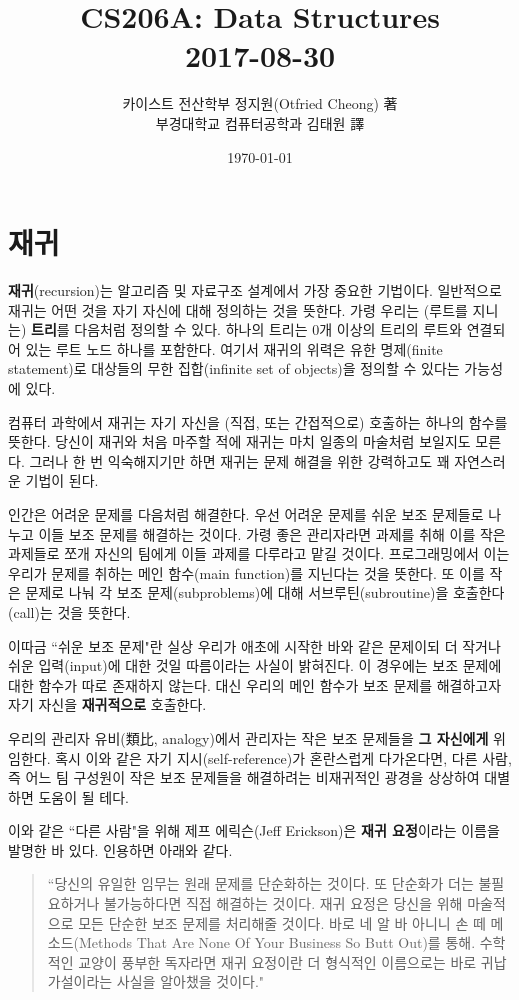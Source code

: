 \documentclass[a4paper]{oblivoir}
\title{CS206A: Data Structures\\2017-08-30}
\author{카이스트 전산학부 정지원(Otfried Cheong) 著\\부경대학교 컴퓨터공학과 김태원 譯}
\date{\today}
\begin{document}
\maketitle

\section*{재귀}
\noindent\textbf{재귀}(recursion)는 알고리즘 및 자료구조 설계에서 가장 중요한 기법이다. 일반적으로 재귀는 어떤 것을 자기 자신에 대해 정의하는 것을 뜻한다. 가령 우리는 (루트를 지니는) \textbf{트리}를 다음처럼 정의할 수 있다. 하나의 트리는 $0$개 이상의 트리의 루트와 연결되어 있는 루트 노드 하나를 포함한다. 여기서 재귀의 위력은 유한 명제(finite statement)로 대상들의 무한 집합(infinite set of objects)을 정의할 수 있다는 가능성에 있다. 

컴퓨터 과학에서 재귀는 자기 자신을 (직접, 또는 간접적으로) 호출하는 하나의 함수를 뜻한다. 당신이 재귀와 처음 마주할 적에 재귀는 마치 일종의 마술처럼 보일지도 모른다. 그러나 한 번 익숙해지기만 하면 재귀는 문제 해결을 위한 강력하고도 꽤 자연스러운 기법이 된다.

인간은 어려운 문제를 다음처럼 해결한다. 우선 어려운 문제를 쉬운 보조 문제들로 나누고 이들 보조 문제를 해결하는 것이다. 가령 좋은 관리자라면 과제를 취해 이를 작은 과제들로 쪼개 자신의 팀에게 이들 과제를 다루라고 맡길 것이다. 프로그래밍에서 이는 우리가 문제를 취하는 메인 함수(main function)를 지닌다는 것을 뜻한다. 또 이를 작은 문제로 나눠 각 보조 문제(subproblems)에 대해 서브루틴(subroutine)을 호출한다(call)는 것을 뜻한다.

이따금 ``쉬운 보조 문제"란 실상 우리가 애초에 시작한 바와 같은 문제이되 더 작거나 쉬운 입력(input)에 대한 것일 따름이라는 사실이 밝혀진다. 이 경우에는 보조 문제에 대한 함수가 따로 존재하지 않는다. 대신 우리의 메인 함수가 보조 문제를 해결하고자 자기 자신을 \textbf{재귀적으로} 호출한다.

우리의 관리자 유비(類比, analogy)에서 관리자는 작은 보조 문제들을 \textbf{그 자신에게} 위임한다. 혹시 이와 같은 자기 지시(self-reference)가 혼란스럽게 다가온다면, 다른 사람, 즉 어느 팀 구성원이 작은 보조 문제들을 해결하려는 비재귀적인 광경을 상상하여 대별하면 도움이 될 테다.

이와 같은 ``다른 사람"을 위해 제프 에릭슨(Jeff Erickson)은 \textbf{재귀 요정}이라는 이름을 발명한 바 있다. 인용하면 아래와 같다.

\begin{quote}
    ``당신의 유일한 임무는 원래 문제를 단순화하는 것이다. 또 단순화가 더는 불필요하거나 불가능하다면 직접 해결하는 것이다. 재귀 요정은 당신을 위해 마술적으로 모든 단순한 보조 문제를 처리해줄 것이다. 바로 네 알 바 아니니 손 떼 메소드(Methods That Are None Of Your Business So Butt Out)를 통해. 수학적인 교양이 풍부한 독자라면 재귀 요정이란 더 형식적인 이름으로는 바로 귀납 가설이라는 사실을 알아챘을 것이다."
\end{quote}
\end{document}
